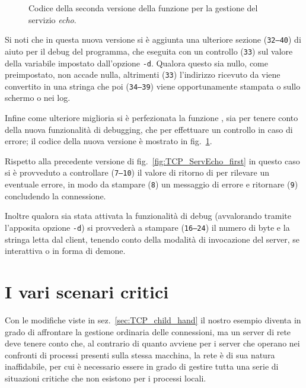 \begin{figure}[!htb]
  \footnotesize \centering
  \begin{minipage}[c]{\codesamplewidth}
  \end{minipage} 
  \normalsize
  \caption{Codice della seconda versione della funzione  per la
    gestione del servizio \textit{echo}.}
  \label{fig:TCP_ServEcho_second}
\end{figure}

Si noti che in questa nuova versione si è aggiunta una ulteriore sezione
(\texttt{\small 32--40}) di aiuto per il debug del programma, che eseguita con
un controllo (\texttt{\small 33}) sul valore della variabile 
impostato dall'opzione \texttt{-d}. Qualora questo sia nullo, come
preimpostato, non accade nulla, altrimenti (\texttt{\small 33}) l'indirizzo
ricevuto da  viene convertito in una stringa che poi
(\texttt{\small 34--39}) viene opportunamente stampata o sullo schermo o nei
log.

Infine come ulteriore miglioria si è perfezionata la funzione ,
sia per tenere conto della nuova funzionalità di debugging, che per effettuare
un controllo in caso di errore; il codice della nuova versione è mostrato in
fig.~\ref{fig:TCP_ServEcho_second}.

 Rispetto alla precedente versione di fig.~\ref{fig:TCP_ServEcho_first} in
questo caso si è provveduto a controllare (\texttt{\small 7--10}) il valore di
ritorno di  per rilevare un eventuale errore, in modo da stampare
(\texttt{\small 8}) un messaggio di errore e ritornare (\texttt{\small 9})
concludendo la connessione.

Inoltre qualora sia stata attivata la funzionalità di debug (avvalorando
 tramite l'apposita opzione \texttt{-d}) si provvederà a
stampare (\texttt{\small 16--24}) il numero di byte e la stringa letta dal
client, tenendo conto della modalità di invocazione del server, se interattiva
o in forma di demone.


\section{I vari scenari critici}
\label{sec:TCP_echo_critical}

Con le modifiche viste in sez.~\ref{sec:TCP_child_hand} il nostro esempio
diventa in grado di affrontare la gestione ordinaria delle connessioni, ma un
server di rete deve tenere conto che, al contrario di quanto avviene per i
server che operano nei confronti di processi presenti sulla stessa macchina,
la rete è di sua natura inaffidabile, per cui è necessario essere in grado di
gestire tutta una serie di situazioni critiche che non esistono per i processi
locali.



